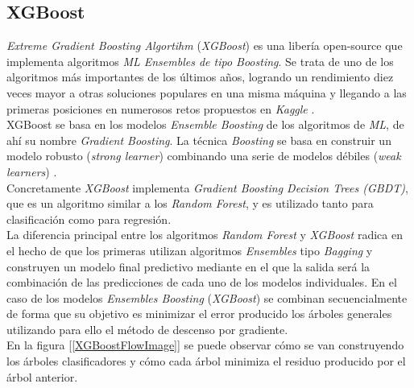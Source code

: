         \subsection {XGBoost}

            
            \textit{Extreme Gradient Boosting Algortihm} (\textit{XGBoost}) es una libería open-source que implementa algoritmos \textit{ML Ensembles de tipo Boosting}. Se trata de uno de los algoritmos más importantes de los últimos años, logrando un rendimiento diez veces mayor a otras soluciones populares en una misma máquina y llegando a las primeras posiciones en numerosos retos propuestos en \textit{Kaggle} \cite{XGBoostTutorial}.\\

            XGBoost se basa en los modelos \textit{Ensemble Boosting} de los algoritmos de \textit{ML}, de ahí su nombre \textit{Gradient Boosting}. La técnica \textit{Boosting} se basa en construir un modelo robusto (\textit{strong learner}) combinando una serie de modelos débiles (\textit{weak learners}) \cite{NvidiaXGBoost}.\\


            Concretamente \textit{XGBoost} implementa \textit{Gradient Boosting Decision Trees (GBDT)}, que es un algoritmo similar a los \textit{Random Forest}, y es utilizado tanto para clasificación como para regresión.\\

            La diferencia principal entre los algoritmos \textit{Random Forest} y \textit{XGBoost} radica en el hecho de que los primeras utilizan algoritmos \textit{Ensembles} tipo \textit{Bagging} y construyen un modelo final predictivo mediante en el que la salida será la combinación de las predicciones de cada uno de los modelos individuales. En el caso de los modelos \textit{Ensembles Boosting} (\textit{XGBoost}) se combinan secuencialmente de forma que su objetivo es minimizar el error producido los árboles generales utilizando para ello el método de descenso por gradiente.\\


            En la figura [\ref{XGBoostFlowImage}] se puede observar cómo se van construyendo los árboles clasificadores y cómo cada árbol minimiza el residuo producido por el árbol anterior.\\


